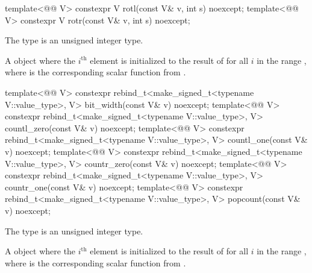 \begin{itemdecl}
template<@@ V> constexpr V rotl(const V& v, int s) noexcept;
template<@@ V> constexpr V rotr(const V& v, int s) noexcept;
\end{itemdecl}

\begin{itemdescr}
\pnum
\constraints
The type  is an unsigned integer type.

\pnum
\returns
A  object where the $i^\text{th}$ element is initialized to
the result of  for all $i$ in the
range , where  is the corresponding
scalar function from .
\end{itemdescr}

\begin{itemdecl}
template<@@ V>
  constexpr rebind_t<make_signed_t<typename V::value_type>, V> bit_width(const V& v) noexcept;
template<@@ V>
  constexpr rebind_t<make_signed_t<typename V::value_type>, V> countl_zero(const V& v) noexcept;
template<@@ V>
  constexpr rebind_t<make_signed_t<typename V::value_type>, V> countl_one(const V& v) noexcept;
template<@@ V>
  constexpr rebind_t<make_signed_t<typename V::value_type>, V> countr_zero(const V& v) noexcept;
template<@@ V>
  constexpr rebind_t<make_signed_t<typename V::value_type>, V> countr_one(const V& v) noexcept;
template<@@ V>
  constexpr rebind_t<make_signed_t<typename V::value_type>, V> popcount(const V& v) noexcept;
\end{itemdecl}

\begin{itemdescr}
\pnum
\constraints
The type  is an unsigned integer type.

\pnum
\returns
A  object where the $i^\text{th}$ element is initialized to
the result of  for all $i$ in the range
, where  is the corresponding scalar
function from .
\end{itemdescr}

